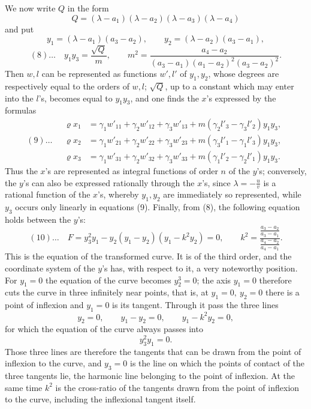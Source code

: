 \documentclass[10pt]{article}
\begin{document}
We now write \(Q\) in the form
\[
Q=(\lambda-a_1)(\lambda-a_2)(\lambda-a_3)(\lambda-a_4)
\]
and put
\[
y_1=(\lambda-a_1)(a_3-a_2),\qquad
y_2=(\lambda-a_2)(a_3-a_1),
\]
\[
(8)\ldots\quad y_1y_3=\frac{\sqrt Q}{m},\qquad
m^2=\frac{a_4-a_2}{(a_3-a_1)(a_1-a_2)^2(a_3-a_2)^2}.
\]
Then \(w,l\) can be represented as functions \(w',l'\) of \(y_1,y_2\), whose degrees are respectively equal to the orders of \(w,l\); \(\sqrt Q\), up to a constant which may enter into the \(l\)'s, becomes equal to \(y_1y_3\), and one finds the \(x\)'s expressed by the formulas
\[
(9)\ldots\quad
\begin{aligned}
\varrho x_1&=\gamma_1w'_{11}+\gamma_2w'_{12}+\gamma_3w'_{13}
+m(\gamma_2l'_3-\gamma_3l'_2)y_1y_3,\\
\varrho x_2&=\gamma_1w'_{21}+\gamma_2w'_{22}+\gamma_3w'_{23}
+m(\gamma_3l'_1-\gamma_1l'_3)y_1y_3,\\
\varrho x_3&=\gamma_1w'_{31}+\gamma_2w'_{32}+\gamma_3w'_{33}
+m(\gamma_1l'_2-\gamma_2l'_1)y_1y_3.
\end{aligned}
\]
Thus the \(x\)'s are represented as integral functions of order \(n\) of the \(y\)'s; conversely, the \(y\)'s can also be expressed rationally through the \(x\)'s, since \(\lambda=-\frac{u}{v}\) is a rational function of the \(x\)'s, whereby \(y_1,y_2\) are immediately so represented, while \(y_3\) occurs only linearly in equations (9). Finally, from (8), the following equation holds between the \(y\)'s:
\[
(10)\ldots\quad
F=y_3^2y_1-y_2(y_1-y_2)(y_1-k^2y_2)=0,\qquad
k^2=\frac{\frac{a_3-a_2}{a_3-a_1}}{\frac{a_4-a_2}{a_4-a_1}}.
\]
This is the equation of the transformed curve. It is of the third order, and the coordinate system of the \(y\)'s has, with respect to it, a very noteworthy position. For \(y_1=0\) the equation of the curve becomes \(y_2^3=0\); the axis \(y_1=0\) therefore cuts the curve in three infinitely near points, that is, at \(y_1=0,\ y_2=0\) there is a point of inflexion and \(y_1=0\) is its tangent. Through it pass the three lines
\[
y_2=0,\qquad y_1-y_2=0,\qquad y_1-k^2y_2=0,
\]
for which the equation of the curve always passes into
\[
y_3^2y_1=0.
\]
Those three lines are therefore the tangents that can be drawn from the point of inflexion to the curve, and \(y_3=0\) is the line on which the points of contact of the three tangents lie, the harmonic line belonging to the point of inflexion. At the same time \(k^2\) is the cross-ratio of the tangents drawn from the point of inflexion to the curve, including the inflexional tangent itself.
\end{document}
